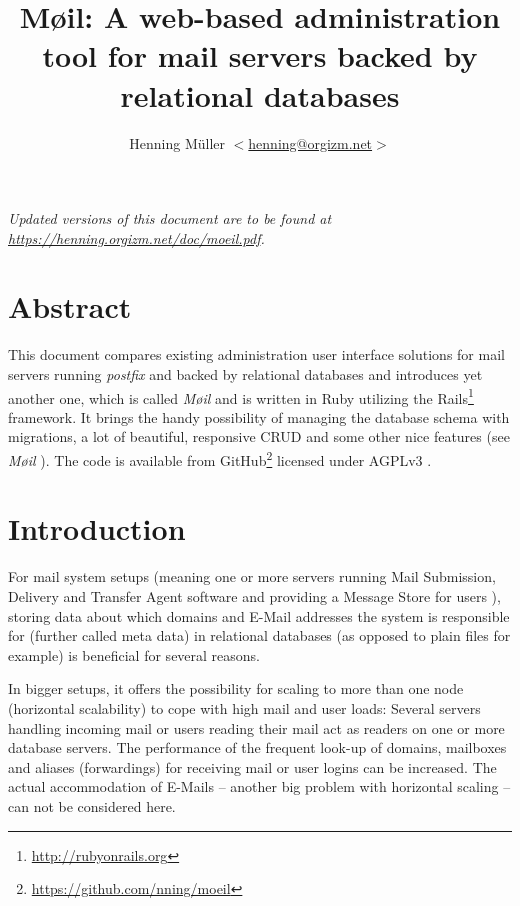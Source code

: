 \documentclass[12pt,a4paper]{scrartcl}
\begin{document}
	\title{Møil: A web-based administration tool for mail servers backed by relational databases}
	\author{Henning Müller $<$\href{mailto:henning@orgizm.net}{henning@orgizm.net}$>$}
	\date{}

	\maketitle

	\begin{center}
		\textit{Updated versions of this document are to be found at \\
			\url{https://henning.orgizm.net/doc/moeil.pdf}.}
	\end{center}

	\tableofcontents

	\section{Abstract}
		This document compares existing administration user interface solutions
		for mail servers running \emph{postfix} and backed by relational
		databases and introduces yet another one, which is called \emph{Møil}
		and is written in Ruby utilizing the
		\ac{Rails}\footnote{\url{http://rubyonrails.org}} framework. It brings
		the handy possibility of managing the database schema with migrations,
		a lot of beautiful, responsive \acs{CRUD} and some other nice features
		(see \emph{Møil} ). The code is available
		from GitHub\footnote{\url{https://github.com/nning/moeil}} licensed
		under AGPLv3 \cite{agpl}.

	\section{Introduction}

		For mail system setups (meaning one or more servers running Mail
		Submission, Delivery and Transfer Agent software and providing a
		Message Store for users \cite{mail-architecture}), storing data about
		which domains and E-Mail addresses the system is responsible for
		(further called meta data) in relational databases (as opposed to plain
		files for example) is beneficial for several reasons.


		In bigger setups, it offers the possibility for scaling to more than
		one node (horizontal scalability) to cope with high mail and user
		loads: Several servers handling incoming mail or users reading their
		mail act as readers on one or more database servers. The performance of
		the frequent look-up of domains, mailboxes and aliases (forwardings)
		for receiving mail or user logins can be increased. The actual
		accommodation of E-Mails -- another big problem with horizontal scaling
		-- can not be considered here.
\end{document}
